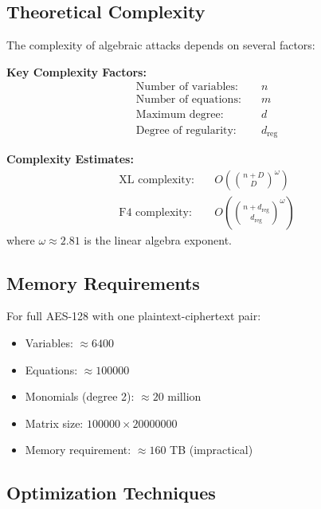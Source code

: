 \documentclass[12pt,a4paper]{article}
\begin{document}
\subsection{Theoretical Complexity}

The complexity of algebraic attacks depends on several factors:

\begin{mathematicsbox}
\textbf{Key Complexity Factors:}
\begin{align}
\text{Number of variables:} \quad & n \\
\text{Number of equations:} \quad & m \\
\text{Maximum degree:} \quad & d \\
\text{Degree of regularity:} \quad & d_{\text{reg}}
\end{align}

\textbf{Complexity Estimates:}
\begin{align}
\text{XL complexity:} \quad & O\left(\binom{n+D}{D}^{\omega}\right) \\
\text{F4 complexity:} \quad & O\left(\binom{n+d_{\text{reg}}}{d_{\text{reg}}}^{\omega}\right)
\end{align}
where $\omega \approx 2.81$ is the linear algebra exponent.
\end{mathematicsbox}

\subsection{Memory Requirements}

\begin{examplebox}[title=Memory Analysis for AES]
For full AES-128 with one plaintext-ciphertext pair:
\begin{itemize}
    \item Variables: $\approx 6400$
    \item Equations: $\approx 100000$
    \item Monomials (degree 2): $\approx 20$ million
    \item Matrix size: $100000 \times 20000000$
    \item Memory requirement: $\approx 160$ TB (impractical)
\end{itemize}
\end{examplebox}

\subsection{Optimization Techniques}
\end{document}
